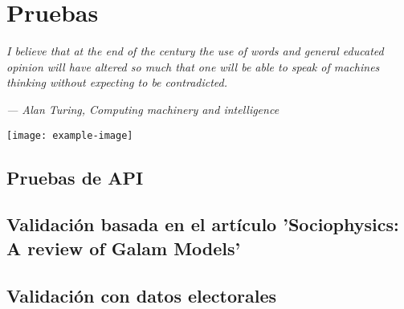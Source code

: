 \chapter{Pruebas} 
\epigraph{\textit{I believe that at the end of the century the use of words and general educated opinion will have altered so much that one will be able to speak of machines thinking without expecting to be contradicted.     
	}}{\textit{—  Alan Turing, Computing machinery and intelligence}}
	\vspace*{8cm}
	\begin{center}
		\centering
		\texttt{[image: example-image]}
	\end{center}
	\thispagestyle{empty}
	\newpage
\vspace*{2cm}

\section{Pruebas de API}

\section{Validación basada en el artículo 'Sociophysics: A review of Galam Models'}

\section{Validación con datos electorales}